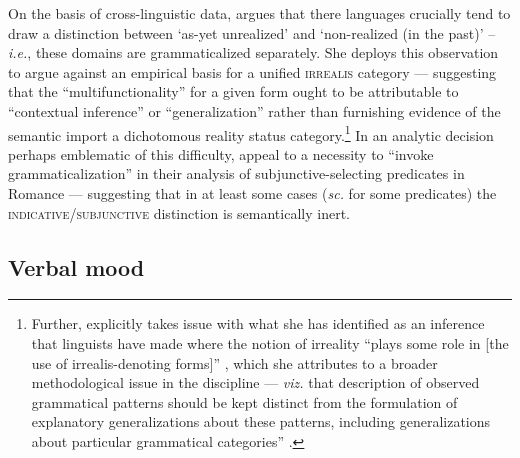 On the basis of cross-linguistic data, \citet[138\textit{ff}]{Cristofaro2012} argues that there languages crucially tend to draw a distinction between `as-yet unrealized' and `non-realized (in the past)' -- \textit{i.e.}, these domains are grammaticalized separately. She deploys this observation to argue against an empirical basis for a unified \textsc{irrealis} category --- suggesting that the ``multifunctionality'' for a given form ought to be attributable to ``contextual inference'' or ``generalization'' rather than furnishing evidence of the semantic import a dichotomous reality status category.\footnote{Further, \citeauthor{Cristofaro2012} explicitly takes issue with what she has identified as an inference that linguists have made where the notion of irreality ``plays some role in [the use of irrealis-denoting forms]'' \citeyearpar[132]{Cristofaro2012}, which she attributes to a broader methodological issue in the discipline --- \textit{viz.} that description of observed grammatical patterns should be kept distinct from the formulation of explanatory generalizations about these patterns, including generalizations about particular grammatical categories'' \citeyearpar[145]{Cristofaro2012}.}  In an analytic decision perhaps emblematic of this difficulty, \citet[467]{Portner2012} appeal to a necessity to ``invoke  grammaticalization'' in their analysis of subjunctive-selecting predicates in Romance --- suggesting that in at least some cases (\textit{sc.} for some predicates) the \textsc{indicative/subjunctive} distinction is semantically inert.
	
	
\subsection{Verbal mood}

